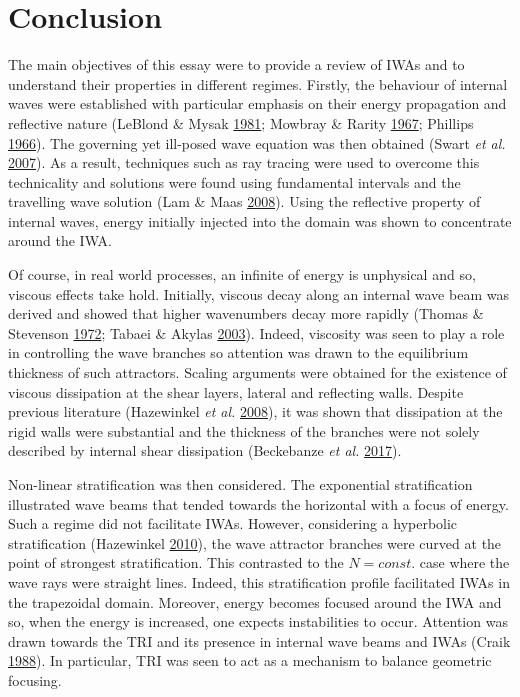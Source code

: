 \documentclass[a4paper]{article}
\numberwithin{equation}{section}
\begin{document}
\section{Conclusion}
The main objectives of this essay were to provide a review of IWAs and to understand their properties in different regimes. Firstly, the behaviour of internal waves were established with particular emphasis on their energy propagation and reflective nature (LeBlond \& Mysak \hyperlink{ref 4}{1981}; Mowbray \& Rarity \hyperlink{ref 5}{1967}; Phillips \hyperlink{ref 7}{1966}). The governing yet ill-posed wave equation was then obtained (Swart \emph{et al.} \hyperlink{ref 15}{2007}). As a result, techniques such as ray tracing were used to overcome this technicality and solutions were found using fundamental intervals and the travelling wave solution (Lam \& Maas  \hyperlink{ref 18}{2008}). Using the reflective property of internal waves, energy initially injected into the domain was shown to concentrate around the IWA.

Of course, in real world processes, an infinite of energy is unphysical and so, viscous effects take hold. Initially, viscous decay along an internal wave beam was derived and showed that higher wavenumbers decay more rapidly (Thomas \& Stevenson \hyperlink{ref 21}{1972}; Tabaei \& Akylas \hyperlink{ref 22}{2003}). Indeed, viscosity was seen to play a role in controlling the wave branches so attention was drawn to the equilibrium thickness of such attractors. Scaling arguments were obtained for the existence of viscous dissipation at the shear layers, lateral and reflecting walls. Despite previous literature (Hazewinkel \emph{et al.} \hyperlink{ref 27}{2008}), it was shown that dissipation at the rigid walls were substantial and the thickness of the branches were not solely described by internal shear dissipation (Beckebanze \emph{et al.} \hyperlink{ref 8}{2017}).

Non-linear stratification was then considered. The exponential stratification illustrated wave beams that tended towards the horizontal with a focus of energy. Such a regime did not facilitate IWAs. However, considering a hyperbolic stratification (Hazewinkel \hyperlink{ref 24}{2010}), the wave attractor branches were curved at the point of strongest stratification. This contrasted to the $N = const.$ case where the wave rays were straight lines. Indeed, this stratification profile facilitated IWAs in the trapezoidal domain. Moreover, energy becomes focused around the IWA and so, when the energy is increased, one expects instabilities to occur. Attention was drawn towards the TRI and its presence in internal wave beams and IWAs (Craik \hyperlink{ref 32}{1988}). In particular, TRI was seen to act as a mechanism to balance geometric focusing. 
\end{document}
